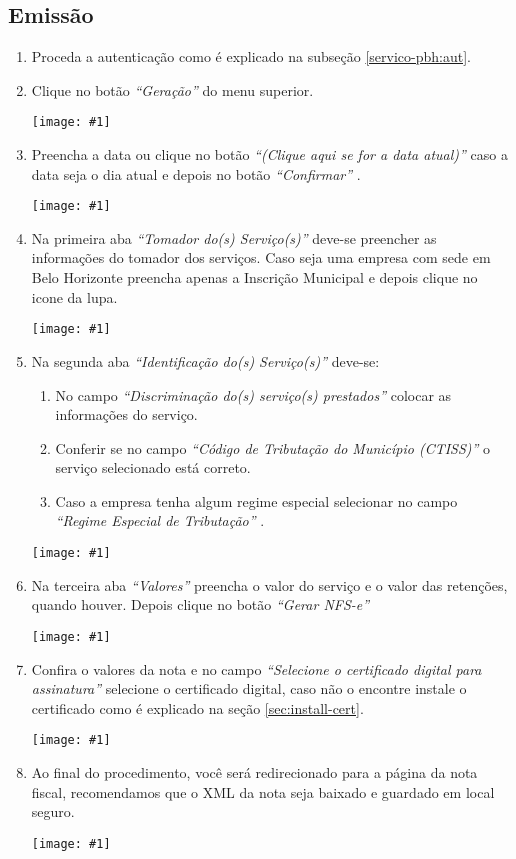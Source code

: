 \documentclass{article}
\newcommand{\itasp}[1]{
  \textit{``#1''}
}
\newcommand{\imagem}[2]{
  \begin{center}
    \texttt{[image: \#1]}
  \end{center}
}
\begin{document}
\subsection{Emissão}
\label{servico-pbh:emis}
\begin{enumerate}
  \item Proceda a autenticação como é explicado na subseção \ref{servico-pbh:aut}.
  \item Clique no botão \itasp{Geração} do menu superior. \imagem{menu-nota-pbh}{0.7}
  \item Preencha a data ou clique no botão \itasp{(Clique aqui se for a data atual)} caso a data seja o dia atual e depois no botão \itasp{Confirmar}. \imagem{emissao-popup}{0.4}
  \pagebreak
  \item Na primeira aba \itasp{Tomador do(s) Serviço(s)} deve-se preencher as informações do tomador dos serviços. Caso seja uma empresa com sede em Belo Horizonte preencha apenas a Inscrição Municipal e depois clique no icone da lupa. \imagem{aba-tomador}{0.8}
  \item Na segunda aba \itasp{Identificação do(s) Serviço(s)} deve-se:
  \begin{enumerate}[label*=\arabic*.]
    \item No campo \itasp{Discriminação do(s) serviço(s) prestados} colocar as informações do serviço.
    \item Conferir se no campo \itasp{Código de Tributação do Município (CTISS)} o serviço selecionado está correto.
    \item Caso a empresa tenha algum regime especial selecionar no campo \itasp{Regime Especial de Tributação}.
  \end{enumerate}
  \imagem{aba-identificacao}{0.8}
  \pagebreak
  \item Na terceira aba \itasp{Valores} preencha o valor do serviço e o valor das retenções, quando houver. Depois clique no botão \itasp{Gerar NFS-e} \imagem{aba-valores}{0.8}
  \item Confira o valores da nota e no campo \itasp{Selecione o certificado digital para assinatura} selecione o certificado digital, caso não o encontre instale o certificado como é explicado na seção \ref{sec:install-cert}. \imagem{resumo-nfse}{0.7}
  \item Ao final do procedimento, você será redirecionado para a página da nota fiscal, recomendamos que o XML da nota seja baixado e guardado em local seguro. \imagem{nota-final}{0.7}
\end{enumerate}
\end{document}
